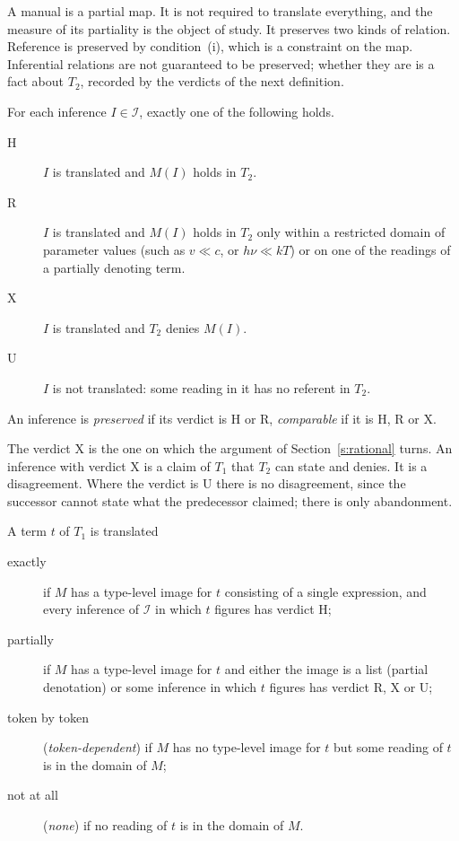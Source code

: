 \documentclass{situationist-preprint}
\begin{document}
A manual is a partial map. It is not required to translate everything, and the measure of its partiality is the object of study. It preserves two kinds of relation. Reference is preserved by condition~(i), which is a constraint on the map. Inferential relations are not guaranteed to be preserved; whether they are is a fact about $T_2$, recorded by the verdicts of the next definition.

\begin{definition}[Verdicts]\label{d:verdict}
For each inference $I \in \mathcal{I}$, exactly one of the following holds.
\begin{description}
\item[H] $I$ is translated and $M(I)$ holds in $T_2$.
\item[R] $I$ is translated and $M(I)$ holds in $T_2$ only within a restricted domain of parameter values (such as $v \ll c$, or $h\nu \ll kT$) or on one of the readings of a partially denoting term.
\item[X] $I$ is translated and $T_2$ denies $M(I)$.
\item[U] $I$ is not translated: some reading in it has no referent in $T_2$.
\end{description}
An inference is \emph{preserved} if its verdict is H or R, \emph{comparable} if it is H, R or X.
\end{definition}

The verdict X is the one on which the argument of Section~\ref{s:rational} turns. An inference with verdict X is a claim of $T_1$ that $T_2$ can state and denies. It is a disagreement. Where the verdict is U there is no disagreement, since the successor cannot state what the predecessor claimed; there is only abandonment.

\begin{definition}\label{d:status}
A term $t$ of $T_1$ is translated
\begin{description}
\item[exactly] if $M$ has a type-level image for $t$ consisting of a single expression, and every inference of $\mathcal{I}$ in which $t$ figures has verdict H;
\item[partially] if $M$ has a type-level image for $t$ and either the image is a list (partial denotation) or some inference in which $t$ figures has verdict R, X or U;
\item[token by token] (\emph{token-dependent}) if $M$ has no type-level image for $t$ but some reading of $t$ is in the domain of $M$;
\item[not at all] (\emph{none}) if no reading of $t$ is in the domain of $M$.
\end{description}
\end{definition}
\end{document}

